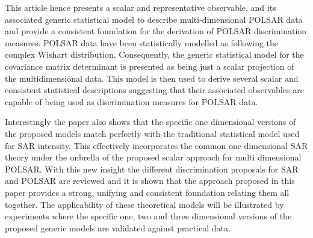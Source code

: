 \documentclass[journal]{IEEEtran}
\begin{document}
This article hence presents a scalar and representative observable, and its associated generic statistical model to describe multi-dimensional POLSAR data and provide a consistent foundation for the derivation of POLSAR discrimination measures.
POLSAR data have been statistically modelled as following the complex Wishart distribution.
Consequently, the generic statistical model for the covariance matrix determinant is presented as being just a scalar projection of the multidimensional data.
This model is then used to derive several scalar and consistent statistical descriptions suggesting that their associated observables are capable of being used as discrimination measures for POLSAR data.
%

Interestingly the paper also shows that %
  the specific one dimensional versions of the proposed  models 
  match perfectly with the traditional statistical model used for SAR intensity.
This effectively incorporates the common one dimensional SAR theory under the unbrella of the proposed scalar approach for multi dimensional POLSAR.
With this new insight the different discrimination proposals for SAR and POLSAR are reviewed and it is shown that the approach proposed in this paper provides a strong, unifying and consistent foundation relating them all together.
The applicability of these theoretical models will be illustrated by experiments where the specific one, two and three dimensional versions of the proposed generic models are validated against practical data. 
\end{document}
